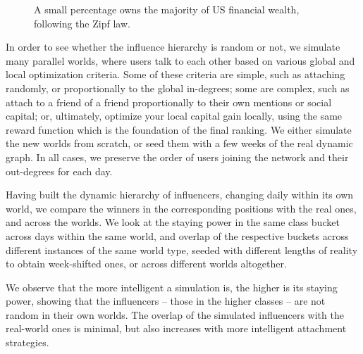 \documentclass[10pt,oneside]{memoir}
\begin{document}
\begin{Spacing}{2}
\begin{figure}[ht]
    \caption{A small percentage owns the majority of US financial wealth, following the Zipf law.}
    \label{figure:us-fin-wealth-hierarchy}
\endminipage
\end{figure}
In order to see whether the influence hierarchy is random or not, we simulate many parallel worlds, where users talk to each other based on various global and local optimization criteria.  Some of these criteria are simple, such as attaching randomly, or proportionally to the global in-degrees; some are complex, such as attach to a friend of a friend proportionally to their own mentions or social capital; or, ultimately, optimize your local capital gain locally, using the same reward function which is the foundation of the final ranking.  We either simulate the new worlds from scratch, or seed them with a few weeks of the real dynamic graph.  In all cases, we preserve the order of users joining the network and their out-degrees for each day.


Having built the dynamic hierarchy of influencers, changing daily within its own world, we compare the winners in the corresponding positions with the real ones, and across the worlds.  We look at the staying power in the same class bucket across days within the same world, and overlap of the respective buckets across different instances of the same world type, seeded with different lengths of reality to obtain week-shifted ones, or across different worlds altogether.


We observe that the more intelligent a simulation is, the higher is its staying power, showing that the influencers -- those in the higher classes -- are not random in their own worlds.  The overlap of the simulated influencers with the real-world ones is minimal, but also increases with more intelligent attachment strategies.



\end{Spacing}
\end{document}
